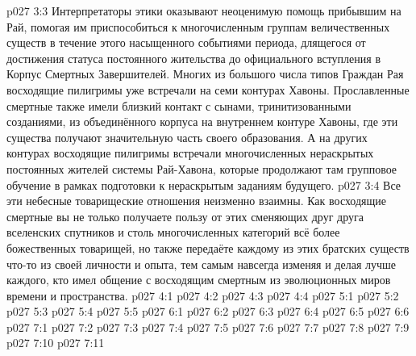 \vs p027 3:3 Интерпретаторы этики оказывают неоценимую помощь прибывшим на Рай, помогая им приспособиться к многочисленным группам величественных существ в течение этого насыщенного событиями периода, длящегося от достижения статуса постоянного жительства до официального вступления в Корпус Смертных Завершителей. Многих из большого числа типов Граждан Рая восходящие пилигримы уже встречали на семи контурах Хавоны. Прославленные смертные также имели близкий контакт с сынами, тринитизованными созданиями, из объединённого корпуса на внутреннем контуре Хавоны, где эти существа получают значительную часть своего образования. А на других контурах восходящие пилигримы встречали многочисленных нераскрытых постоянных жителей системы Рай\hyp{}Хавона, которые продолжают там групповое обучение в рамках подготовки к нераскрытым заданиям будущего.
\vs p027 3:4 Все эти небесные товарищеские отношения неизменно взаимны. Как восходящие смертные вы не только получаете пользу от этих сменяющих друг друга вселенских спутников и столь многочисленных категорий всё более божественных товарищей, но также передаёте каждому из этих братских существ что\hyp{}то из своей личности и опыта, тем самым навсегда изменяя и делая лучше каждого, кто имел общение с восходящим смертным из эволюционных миров времени и пространства.
\vs p027 4:1 
\vs p027 4:2 
\vs p027 4:3 
\vs p027 4:4 
\vs p027 5:1 
\vs p027 5:2 
\vs p027 5:3 
\vs p027 5:4 
\vs p027 5:5 
\vs p027 6:1 
\vs p027 6:2 
\vs p027 6:3 
\vs p027 6:4 
\vs p027 6:5 
\vs p027 6:6 
\vs p027 7:1 
\vs p027 7:2 \pc 
\vs p027 7:3 
\vs p027 7:4 \pc 
\vs p027 7:5 
\vs p027 7:6 
\vs p027 7:7 
\vs p027 7:8 \pc 
\vs p027 7:9 \pc 
\vs p027 7:10 
\vsetoff
\vs p027 7:11 
\quizlink
